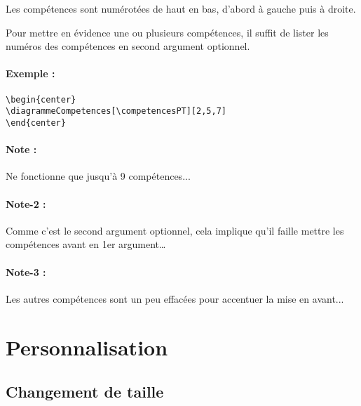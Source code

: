 \documentclass[a4paper,12pt]{article}
\begin{document}
		Les compétences sont numérotées de haut en bas, d'abord à gauche puis à droite.

		\begin{center}
			\diagrammeCompetences[1,2,3,4,5,6,7,...]
		\end{center}

		Pour mettre en évidence une ou plusieurs compétences, il suffit de lister les numéros des compétences en second argument optionnel.

		\paragraph{Exemple :}
\begin{verbatim}
\begin{center}
\diagrammeCompetences[\competencesPT][2,5,7]
\end{center}
\end{verbatim}

		\begin{center}
			\diagrammeCompetences[\competencesPT][2,5,7]
		\end{center}

		\paragraph{Note :} Ne fonctionne que jusqu'à 9 compétences...
		\paragraph{Note-2 :} Comme c'est le second argument optionnel, cela implique qu'il faille mettre les compétences avant en 1er argument\dots
		\paragraph{Note-3 :} Les autres compétences sont un peu effacées pour accentuer la mise en avant...



	\section{Personnalisation}


		\subsection{Changement de taille}
\end{document}
